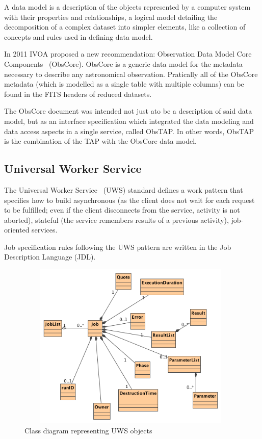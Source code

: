 A data model is a description of the objects represented by a computer system with their properties and relationships, a logical model detailing the decomposition of a complex dataset into simpler elements, like a collection of concepts and rules used in defining data model. 

In 2011 IVOA proposed a new recommendation: Observation Data Model Core
Components~\cite{2011arXiv1111.1758L} (ObsCore). ObsCore is a 
generic data model for the metadata necessary to describe any astronomical observation. Pratically all of the ObsCore metadata (which is modelled as a single table with multiple columns) can be found in the FITS headers of reduced datasets.

The ObsCore document was intended not just ato be a description of said data model, but as an interface specification which integrated the data modeling and data access aspects in a single service, called ObsTAP.
In other words, ObsTAP is the combination of the TAP with the ObsCore data model.


\subsection{Universal Worker Service} %
\label{sub:universal_worker_service}

The Universal Worker Service~\cite{2010uws..irec.....H} (UWS) 
standard defines a work
pattern 
that specifies
how to build asynchronous (as the client does not wait for each request to be fulfilled; even if the client disconnects from the service, activity is not aborted), stateful (the service remembers results of a previous activity), job-oriented services.

Job specification rules following the UWS pattern are written in the Job Description Language (JDL).

\begin{figure}[tb]
\centering
\includegraphics[width=11cm,height=8cm]{images/Class_Diagram__UWS__UWSObjects.png}
\caption{Class diagram representing UWS objects}
\end{figure}

